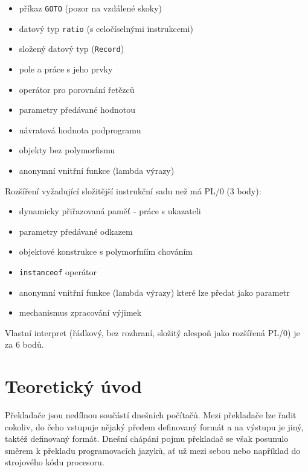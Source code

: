 \documentclass[a4paper]{article}
\begin{document}
\begin{itemize}
\item p\v{r}\'ikaz \texttt{GOTO} (pozor na vzd\'alen\'e skoky)
\item datov\'y typ \texttt{ratio} (s celo\v{c}\'iseln\'ymi instrukcemi)
\item slo\v{z}en\'y datov\'y typ (\texttt{Record})
\item pole a pr\'ace s jeho prvky
\item oper\'ator pro porovn\'an\'i \v{r}et\v{e}zc\r{u}
\item parametry p\v{r}ed\'avan\'e hodnotou
\item n\'avratov\'a hodnota podprogramu
\item objekty bez polymorfismu
\item anonymn\'i vnit\v{r}n\'i funkce (lambda v\'yrazy)
\end{itemize}

Roz\v{s}\'i\v{r}en\'i vy\v{z}aduj\'ic\'i slo\v{z}it\v{e}j\v{s}\'i
instruk\v{c}n\'i sadu ne\v{z} m\'a PL/0 (3 body):

\begin{itemize}
\item dynamicky p\v{r}i\v{r}azovan\'a pam\v{e}\v{t} - pr\'ace s ukazateli
\item parametry p\v{r}ed\'avan\'e odkazem
\item objektov\'e konstrukce s polymorfní\'im chov\'an\'im
\item \texttt{instanceof} oper\'ator
\item anonymn\'i vnit\v{r}n\'i funkce (lambda v\'yrazy) kter\'e lze p\v{r}edat
	jako parametr
\item mechanismus zpracov\'an\'i v\'yjimek
\end{itemize}

Vlastn\'i interpret (\v{r}\'adkov\'y, bez rozhran\'i, slo\v{z}it\'y alespo\v{n}
jako roz\v{s}\'i\v{r}en\'a PL/0) je za 6 bod\r{u}. 
\clearpage
\section{Teoretick\'y \'uvod}
P\v{r}eklada\v{c}e jsou ned\'ilnou sou\v{c}\'ast\'i dne\v{s}n\'ich
po\v{c}\'ita\v{c}\r{u}. Mezi p\v{r}eklada\v{c}e lze \v{r}adit cokoliv,
do \v{c}eho vstupuje n\v{e}jak\'y p\v{r}edem definovan\'y form\'at a na
v\'ystupu je jin\'y, takt\'e\v{z} definovan\'y form\'at.
Dne\v{s}n\'i ch\'ap\'an\'i pojmu p\v{r}eklada\v{c} se v\v{s}ak posunulo
sm\v{e}rem k p\v{r}ekladu programovac\'ich jazyk\r{u}, a\v{t} u\v{z} mezi
sebou nebo nap\v{r}\'iklad do strojov\'eho k\'odu procesoru.
\end{document}
